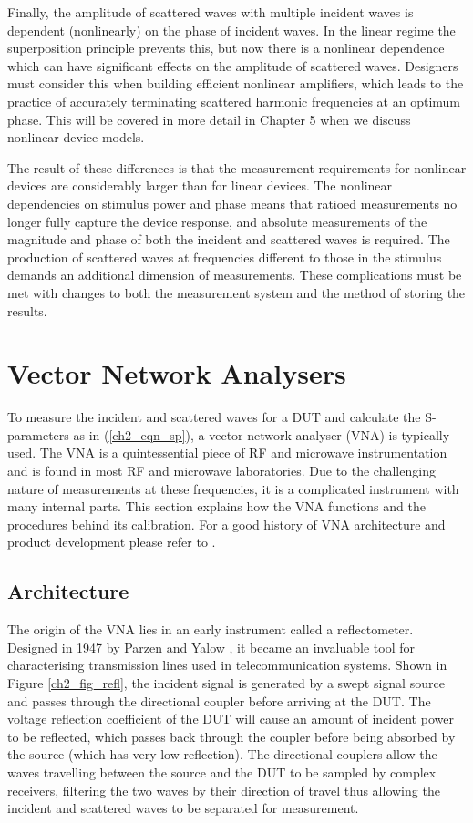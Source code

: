 \documentclass[../thesis/thesis.tex]{subfiles}
\begin{document}
Finally, the amplitude of scattered waves with multiple incident waves is dependent (nonlinearly) on the phase of incident waves. In the linear regime the superposition principle prevents this, but now there is a nonlinear dependence which can have significant effects on the amplitude of scattered waves. Designers must consider this when building efficient nonlinear amplifiers, which leads to the practice of accurately terminating scattered harmonic frequencies at an optimum phase. This will be covered in more detail in Chapter 5 when we discuss nonlinear device models. 

The result of these differences is that the measurement requirements for nonlinear devices are considerably larger than for linear devices. The nonlinear dependencies on stimulus power and phase means that ratioed measurements no longer fully capture the device response, and absolute measurements of the magnitude and phase of both the incident and scattered waves is required. The production of scattered waves at frequencies different to those in the stimulus demands an additional dimension of measurements. These complications must be met with changes to both the measurement system and the method of storing the results.

\section{Vector Network Analysers}

To measure the incident and scattered waves for a DUT and calculate the S-parameters as in (\ref{ch2_eqn_sp}), a vector network analyser (VNA) is typically used. The VNA is a quintessential piece of RF and microwave instrumentation and is found in most RF and microwave laboratories. Due to the challenging nature of measurements at these frequencies, it is a complicated instrument with many internal parts. This section explains how the VNA functions and the procedures behind its calibration. For a good history of VNA architecture and product development please refer to \cite{Teppati_2013,Dunsmore_2012,Rytting_2008}.

\subsection{Architecture}

The origin of the VNA lies in an early instrument called a reflectometer. Designed in 1947 by Parzen and Yalow \cite{Parzen_1947}, it became an invaluable tool for characterising transmission lines used in telecommunication systems. Shown in Figure \ref{ch2_fig_refl}, the incident signal is generated by a swept signal source and passes through the directional coupler before arriving at the DUT. The voltage reflection coefficient of the DUT will cause an amount of incident power to be reflected, which passes back through the coupler before being absorbed by the source (which has very low reflection). The directional couplers allow the waves travelling between the source and the DUT to be sampled by complex receivers, filtering the two waves by their direction of travel thus allowing the incident and scattered waves to be separated for measurement. 
\end{document}
